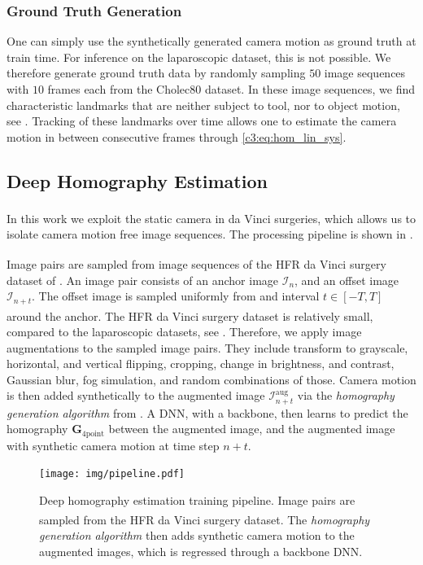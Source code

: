 \subsubsection{Ground Truth Generation}
\label{c3:sec:gt_gen}
One can simply use the synthetically generated camera motion as ground truth at train time. For inference on the laparoscopic dataset, this is not possible. We therefore generate ground truth data by randomly sampling $50$ image sequences with $10$ frames each from the Cholec80 dataset. In these image sequences, we find characteristic landmarks that are neither subject to tool, nor to object motion, see . Tracking of these landmarks over time allows one to estimate the camera motion in between consecutive frames through \eqref{c3:eq:hom_lin_sys}.

\subsection{Deep Homography Estimation}

In this work we exploit the static camera in da Vinci\textsuperscript{\textregistered} surgeries, which allows us to isolate camera motion free image sequences. The processing pipeline is shown in .

Image pairs are sampled from image sequences of the HFR da Vinci\textsuperscript{\textregistered} surgery dataset of . An image pair consists of an anchor image $\mathcal{I}_n$, and an offset image $\mathcal{I}_{n+t}$. The offset image is sampled uniformly from and interval $t\in[-T,T]$ around the anchor. The HFR da Vinci\textsuperscript{\textregistered} surgery dataset is relatively small, compared to the laparoscopic datasets, see . Therefore, we apply image augmentations to the sampled image pairs. They include transform to grayscale, horizontal, and vertical flipping, cropping, change in brightness, and contrast, Gaussian blur, fog simulation, and random combinations of those. Camera motion is then added synthetically to the augmented image $\mathcal{I}^\text{aug}_{n+t}$ via the \textit{homography generation algorithm} from . A DNN, with a backbone, then learns to predict the homography $\mathbf{G}_{4\text{point}}$ between the augmented image, and the augmented image with synthetic camera motion at time step $n+t$.

\begin{figure}[tb]
    \centering
    \texttt{[image: img/pipeline.pdf]}
    \caption{Deep homography estimation training pipeline. Image pairs are sampled from the HFR da Vinci\textsuperscript{\textregistered} surgery dataset. The \textit{homography generation algorithm} then adds synthetic camera motion to the augmented images, which is regressed through a backbone DNN.}
    \label{c3:fig:hom}
\end{figure}

